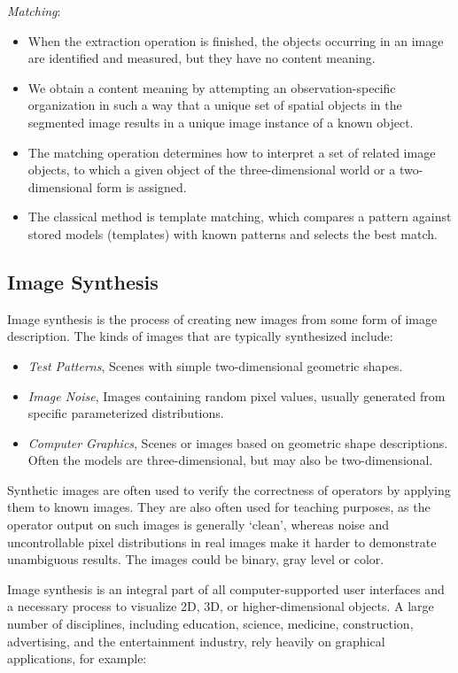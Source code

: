\begin{steps}
\item \textit{Matching}:
		\begin{itemize}
			\item When the extraction operation is finished, the objects occurring in an image are identified and measured, but they have no content meaning. 
			\item We obtain a content meaning by attempting an observation-specific organization in such a way that a unique set of spatial objects in the segmented image results in a unique image instance of a known object. 
			\item The matching operation determines how to interpret a set of related image objects, to which a given object of the three-dimensional world or a two-dimensional form is assigned.
			\item The classical method is template matching, which compares a pattern against stored models (templates) with known patterns and selects the best match.
		\end{itemize}
\end{steps}


\subsection{Image Synthesis}
Image synthesis is the process of creating new images from some form of image description. The kinds of images that are typically synthesized include:

\begin{itemize}
	\item \textit{Test Patterns}, Scenes with simple two-dimensional geometric shapes.
	\item \textit{Image Noise}, Images containing random pixel values, usually generated from specific parameterized distributions.
	\item \textit{Computer Graphics}, Scenes or images based on geometric shape descriptions. Often the models are three-dimensional, but may also be two-dimensional.
\end{itemize}
	Synthetic images are often used to verify the correctness of operators by applying them to known images. They are also often used for teaching purposes, as the operator output on such images is generally `clean', whereas noise and uncontrollable pixel distributions in real images make it harder to demonstrate unambiguous results. The images could be binary, gray level or color.

Image synthesis is an integral part of all computer-supported user interfaces and a necessary process to visualize 2D, 3D, or higher-dimensional objects. A large number
of disciplines, including education, science, medicine, construction, advertising, and the entertainment industry, rely heavily on graphical applications, for example:

